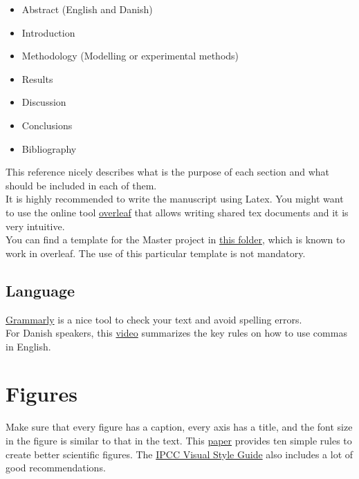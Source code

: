 \documentclass[3p]{elsarticle} %
\begin{document}
\begin{itemize}
\item Abstract (English and Danish)
\item Introduction
\item Methodology (Modelling or experimental methods) 
\item Results
\item Discussion
\item Conclusions
\item Bibliography
\end{itemize}

This reference \cite{Socolofsky_2004} nicely describes what is the purpose of each section and what should be included in each of them. \\

It is highly recommended to write the manuscript using Latex. You might want to use the online tool \href{https://es.overleaf.com}{overleaf} that allows writing shared tex documents and it is very intuitive.\\

You can find a template for the Master project in \href{https://github.com/martavp/resources_master/tree/master/LatexTemplate_MasterThesisProject}{this folder}, which is known to work in overleaf. The use of this particular template is not mandatory.

\subsection{Language}

\href{https://app.grammarly.com/}{Grammarly} is a nice tool to check your text and avoid spelling errors. \\

For Danish speakers, this \href{https://www.youtube.com/watch?v=I_i9bvv3N4M}{video} summarizes the key rules on how to use commas in English. 

\section{Figures}

Make sure that every figure has a caption, every axis has a title, and the font size in the figure is similar to that in the text. This \href{https://doi.org/10.1371/journal.pcbi.1003833}{paper} provides ten simple rules to create better scientific figures. The \href{https://www.ipcc.ch/site/assets/uploads/2019/04/IPCC-visual-style-guide.pdf}{IPCC Visual Style Guide} also includes a lot of good recommendations. 
\end{document}
